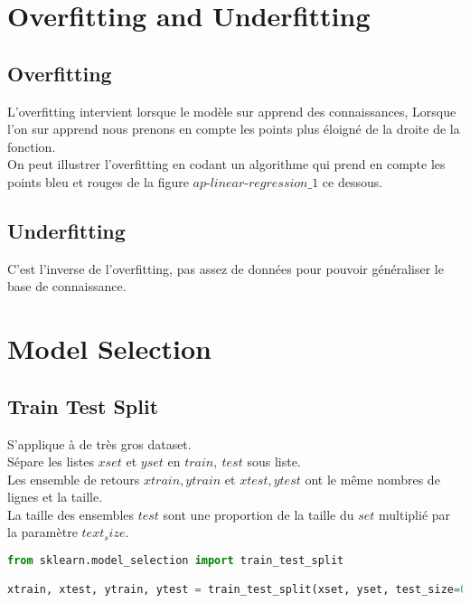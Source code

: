 \chapter{Overfitting and Underfitting}\pagebreak
\section{Overfitting}
L'overfitting intervient lorsque le modèle sur apprend des connaissances,
Lorsque l'on sur apprend nous prenons en compte les points plus éloigné de la droite de la fonction.\\
On peut illustrer l'overfitting en codant un algorithme qui prend en compte les points bleu et rouges de la figure $\textit{ap-linear-regression\_1}$ ce dessous.\\

\section{Underfitting}
C'est l'inverse de l'overfitting, pas assez de données pour pouvoir généraliser le base de connaissance.\\
\pagebreak

\chapter{Model Selection}\pagebreak
\pagebreak
\section{Train Test Split}
S'applique à de très gros dataset.\\
Sépare les listes $xset$ et $yset$ en $train,\ test$ sous liste.\\
Les ensemble de retours $xtrain,ytrain$ et $xtest,ytest$ ont le même nombres de lignes et la taille.\\
La taille des ensembles $test$ sont une proportion de la taille du $set$ multiplié par la paramètre $text_size$.\\

\lstset{style=mlpythoncode}
\begin{lstlisting}[language=Python]
from sklearn.model_selection import train_test_split

xtrain, xtest, ytrain, ytest = train_test_split(xset, yset, test_size=0.1, random_state=0)
\end{lstlisting}

